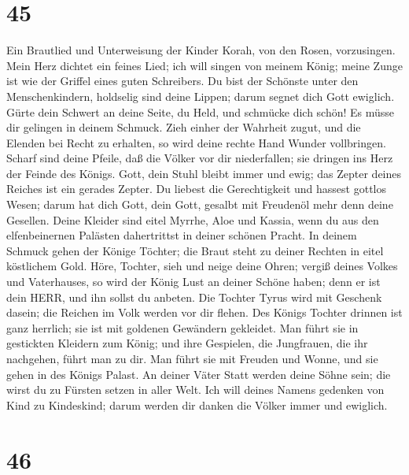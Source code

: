 \hypertarget{section-44}{%
\section{45}\label{section-44}}

 Ein Brautlied und Unterweisung der Kinder Korah, von den
Rosen, vorzusingen. Mein Herz dichtet ein feines Lied; ich will singen
von meinem König; meine Zunge ist wie der Griffel eines guten
Schreibers.  Du bist der Schönste unter den Menschenkindern,
holdselig sind deine Lippen; darum segnet dich Gott ewiglich.
 Gürte dein Schwert an deine Seite, du Held, und schmücke
dich schön!  Es müsse dir gelingen in deinem Schmuck. Zieh
einher der Wahrheit zugut, und die Elenden bei Recht zu erhalten, so
wird deine rechte Hand Wunder vollbringen.  Scharf sind
deine Pfeile, daß die Völker vor dir niederfallen; sie dringen ins Herz
der Feinde des Königs.  Gott, dein Stuhl bleibt immer und
ewig; das Zepter deines Reiches ist ein gerades Zepter.  Du
liebest die Gerechtigkeit und hassest gottlos Wesen; darum hat dich
Gott, dein Gott, gesalbt mit Freudenöl mehr denn deine Gesellen.
 Deine Kleider sind eitel Myrrhe, Aloe und Kassia, wenn du
aus den elfenbeinernen Palästen dahertrittst in deiner schönen Pracht.
 In deinem Schmuck gehen der Könige Töchter; die Braut steht
zu deiner Rechten in eitel köstlichem Gold.  Höre, Tochter,
sieh und neige deine Ohren; vergiß deines Volkes und Vaterhauses,
 so wird der König Lust an deiner Schöne haben; denn er ist
dein HERR, und ihn sollst du anbeten.  Die Tochter Tyrus
wird mit Geschenk dasein; die Reichen im Volk werden vor dir flehen.
 Des Königs Tochter drinnen ist ganz herrlich; sie ist mit
goldenen Gewändern gekleidet.  Man führt sie in gestickten
Kleidern zum König; und ihre Gespielen, die Jungfrauen, die ihr
nachgehen, führt man zu dir.  Man führt sie mit Freuden und
Wonne, und sie gehen in des Königs Palast.  An deiner Väter
Statt werden deine Söhne sein; die wirst du zu Fürsten setzen in aller
Welt.  Ich will deines Namens gedenken von Kind zu
Kindeskind; darum werden dir danken die Völker immer und ewiglich.

\hypertarget{section-45}{%
\section{46}\label{section-45}}

